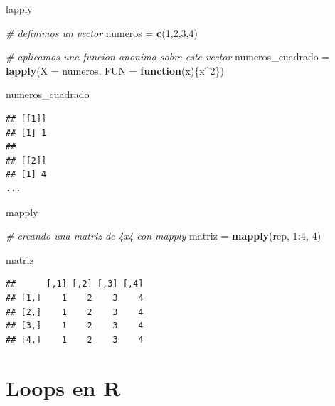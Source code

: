 \documentclass[ignorenonframetext,]{beamer}
\newenvironment{Shaded}{\begin{snugshade}}{\end{snugshade}}
\newcommand{\CommentTok}[1]{\textcolor[rgb]{0.56,0.35,0.01}{\textit{#1}}}
\newcommand{\ControlFlowTok}[1]{\textcolor[rgb]{0.13,0.29,0.53}{\textbf{#1}}}
\newcommand{\DataTypeTok}[1]{\textcolor[rgb]{0.13,0.29,0.53}{#1}}
\newcommand{\DecValTok}[1]{\textcolor[rgb]{0.00,0.00,0.81}{#1}}
\newcommand{\KeywordTok}[1]{\textcolor[rgb]{0.13,0.29,0.53}{\textbf{#1}}}
\newcommand{\NormalTok}[1]{#1}
\newcommand{\OperatorTok}[1]{\textcolor[rgb]{0.81,0.36,0.00}{\textbf{#1}}}
\newcommand{\StringTok}[1]{\textcolor[rgb]{0.31,0.60,0.02}{#1}}
\begin{document}
\begin{frame}[fragile]{lapply}
\protect\hypertarget{lapply}{}

\small

\begin{Shaded}
\begin{Highlighting}[]
\CommentTok{# definimos un vector}
\NormalTok{numeros =}\StringTok{ }\KeywordTok{c}\NormalTok{(}\DecValTok{1}\NormalTok{,}\DecValTok{2}\NormalTok{,}\DecValTok{3}\NormalTok{,}\DecValTok{4}\NormalTok{)}

\CommentTok{# aplicamos una funcion anonima sobre este vector}
\NormalTok{numeros_cuadrado =}\StringTok{ }\KeywordTok{lapply}\NormalTok{(}\DataTypeTok{X =}\NormalTok{ numeros, }\DataTypeTok{FUN =} \ControlFlowTok{function}\NormalTok{(x)\{x}\OperatorTok{^}\DecValTok{2}\NormalTok{\})}

\NormalTok{numeros_cuadrado}
\end{Highlighting}
\end{Shaded}

\begin{verbatim}
## [[1]]
## [1] 1
## 
## [[2]]
## [1] 4
...
\end{verbatim}

\normalsize

\end{frame}

\begin{frame}[fragile]{mapply}
\protect\hypertarget{mapply}{}

\begin{Shaded}
\begin{Highlighting}[]
\CommentTok{# creando una matriz de 4x4 con mapply}
\NormalTok{matriz =}\StringTok{ }\KeywordTok{mapply}\NormalTok{(rep, }\DecValTok{1}\OperatorTok{:}\DecValTok{4}\NormalTok{, }\DecValTok{4}\NormalTok{)}

\NormalTok{matriz}
\end{Highlighting}
\end{Shaded}

\begin{verbatim}
##      [,1] [,2] [,3] [,4]
## [1,]    1    2    3    4
## [2,]    1    2    3    4
## [3,]    1    2    3    4
## [4,]    1    2    3    4
\end{verbatim}

\end{frame}

\hypertarget{loops-en-r}{%
\section{Loops en R}\label{loops-en-r}}
\end{document}
